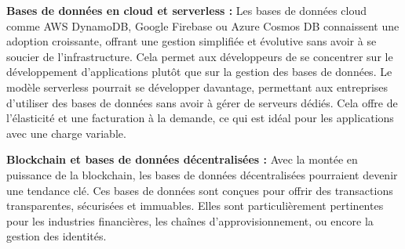 \documentclass{article}
\begin{document}
    \textbf{Bases de données en cloud et serverless :}
        Les bases de données cloud comme AWS DynamoDB, Google Firebase ou Azure Cosmos DB connaissent une adoption croissante, offrant une gestion simplifiée et évolutive sans avoir à se soucier de l'infrastructure. Cela permet aux développeurs de se concentrer sur le développement d’applications plutôt que sur la gestion des bases de données.
        Le modèle serverless pourrait se développer davantage, permettant aux entreprises d’utiliser des bases de données sans avoir à gérer de serveurs dédiés. Cela offre de l’élasticité et une facturation à la demande, ce qui est idéal pour les applications avec une charge variable.

    \textbf{Blockchain et bases de données décentralisées :}
        Avec la montée en puissance de la blockchain, les bases de données décentralisées pourraient devenir une tendance clé. Ces bases de données sont conçues pour offrir des transactions transparentes, sécurisées et immuables. Elles sont particulièrement pertinentes pour les industries financières, les chaînes d'approvisionnement, ou encore la gestion des identités.
\end{document}
